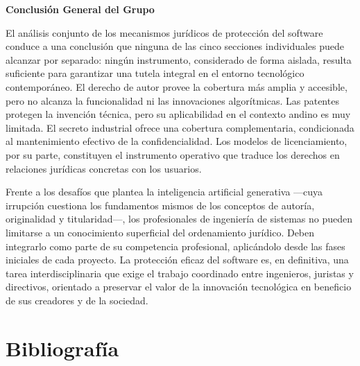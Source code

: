 \documentclass[11pt,a4paper]{report}
\begin{document}
\vspace{0.8cm}

\noindent\textbf{Conclusión General del Grupo}

\smallskip

El análisis conjunto de los mecanismos jurídicos de protección del software conduce a una conclusión que ninguna de las cinco secciones individuales puede alcanzar por separado: ningún instrumento, considerado de forma aislada, resulta suficiente para garantizar una tutela integral en el entorno tecnológico contemporáneo. El derecho de autor provee la cobertura más amplia y accesible, pero no alcanza la funcionalidad ni las innovaciones algorítmicas. Las patentes protegen la invención técnica, pero su aplicabilidad en el contexto andino es muy limitada. El secreto industrial ofrece una cobertura complementaria, condicionada al mantenimiento efectivo de la confidencialidad. Los modelos de licenciamiento, por su parte, constituyen el instrumento operativo que traduce los derechos en relaciones jurídicas concretas con los usuarios.

Frente a los desafíos que plantea la inteligencia artificial generativa —cuya irrupción cuestiona los fundamentos mismos de los conceptos de autoría, originalidad y titularidad—, los profesionales de ingeniería de sistemas no pueden limitarse a un conocimiento superficial del ordenamiento jurídico. Deben integrarlo como parte de su competencia profesional, aplicándolo desde las fases iniciales de cada proyecto. La protección eficaz del software es, en definitiva, una tarea interdisciplinaria que exige el trabajo coordinado entre ingenieros, juristas y directivos, orientado a preservar el valor de la innovación tecnológica en beneficio de sus creadores y de la sociedad.

\newpage

\chapter*{Bibliografía}
\end{document}

